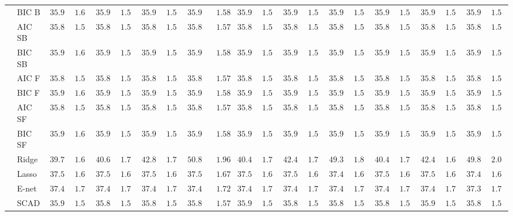\begin{tabular}{llllllllllllllllllllll}
	& BIC B  & $35.95$ & $1.60$ & $35.95$ & $1.57$ & $35.94$ & $1.57$ & $35.93$ & $\phantom{0}1.58$ & $35.93$ & $1.57$ & $35.95$ & $1.57$ & $35.93$ & $1.57$ & $35.94$ & $1.58$ & $35.95$ & $1.57$ & $35.95$ & $1.57$ \\
	& AIC SB  & $35.83$ & $1.56$ & $35.82$ & $1.56$ & $35.82$ & $1.56$ & $35.84$ & $\phantom{0}1.57$ & $35.83$ & $1.57$ & $35.82$ & $1.56$ & $35.82$ & $1.56$ & $35.83$ & $1.56$ & $35.82$ & $1.56$ & $35.83$ & $1.56$ \\
	& BIC SB  & $35.95$ & $1.60$ & $35.95$ & $1.57$ & $35.94$ & $1.57$ & $35.93$ & $\phantom{0}1.58$ & $35.93$ & $1.57$ & $35.95$ & $1.57$ & $35.93$ & $1.57$ & $35.94$ & $1.58$ & $35.95$ & $1.57$ & $35.95$ & $1.57$ \\
	& AIC F  & $35.83$ & $1.56$ & $35.82$ & $1.56$ & $35.83$ & $1.56$ & $35.84$ & $\phantom{0}1.57$ & $35.83$ & $1.56$ & $35.83$ & $1.56$ & $35.85$ & $1.56$ & $35.83$ & $1.56$ & $35.83$ & $1.57$ & $35.84$ & $1.56$ \\
	& BIC F  & $35.95$ & $1.60$ & $35.95$ & $1.57$ & $35.94$ & $1.57$ & $35.93$ & $\phantom{0}1.58$ & $35.93$ & $1.57$ & $35.95$ & $1.56$ & $35.94$ & $1.58$ & $35.94$ & $1.58$ & $35.95$ & $1.57$ & $35.95$ & $1.57$ \\
	& AIC SF  & $35.83$ & $1.56$ & $35.82$ & $1.56$ & $35.83$ & $1.56$ & $35.84$ & $\phantom{0}1.57$ & $35.83$ & $1.56$ & $35.83$ & $1.56$ & $35.85$ & $1.56$ & $35.83$ & $1.56$ & $35.83$ & $1.57$ & $35.84$ & $1.56$ \\
	& BIC SF  & $35.95$ & $1.60$ & $35.95$ & $1.57$ & $35.94$ & $1.57$ & $35.93$ & $\phantom{0}1.58$ & $35.93$ & $1.57$ & $35.95$ & $1.56$ & $35.94$ & $1.58$ & $35.94$ & $1.58$ & $35.95$ & $1.57$ & $35.95$ & $1.57$ \\
	& Ridge  & $39.78$ & $1.68$ & $40.64$ & $1.76$ & $42.89$ & $1.78$ & $50.87$ & $\phantom{0}1.96$ & $40.45$ & $1.73$ & $42.46$ & $1.73$ & $49.34$ & $1.89$ & $40.43$ & $1.70$ & $42.46$ & $1.68$ & $49.89$ & $2.00$ \\
	& Lasso  & $37.54$ & $1.68$ & $37.51$ & $1.67$ & $37.51$ & $1.66$ & $37.51$ & $\phantom{0}1.67$ & $37.52$ & $1.66$ & $37.50$ & $1.66$ & $37.46$ & $1.66$ & $37.52$ & $1.66$ & $37.50$ & $1.67$ & $37.44$ & $1.67$ \\
	& E-net  & $37.48$ & $1.75$ & $37.46$ & $1.71$ & $37.45$ & $1.71$ & $37.44$ & $\phantom{0}1.72$ & $37.46$ & $1.73$ & $37.44$ & $1.73$ & $37.40$ & $1.71$ & $37.46$ & $1.73$ & $37.44$ & $1.71$ & $37.38$ & $1.73$ \\
	& SCAD  & $35.90$ & $1.57$ & $35.89$ & $1.58$ & $35.89$ & $1.57$ & $35.88$ & $\phantom{0}1.57$ & $35.90$ & $1.57$ & $35.88$ & $1.58$ & $35.87$ & $1.57$ & $35.89$ & $1.58$ & $35.90$ & $1.58$ & $35.89$ & $1.58$ \\

\end{tabular}
